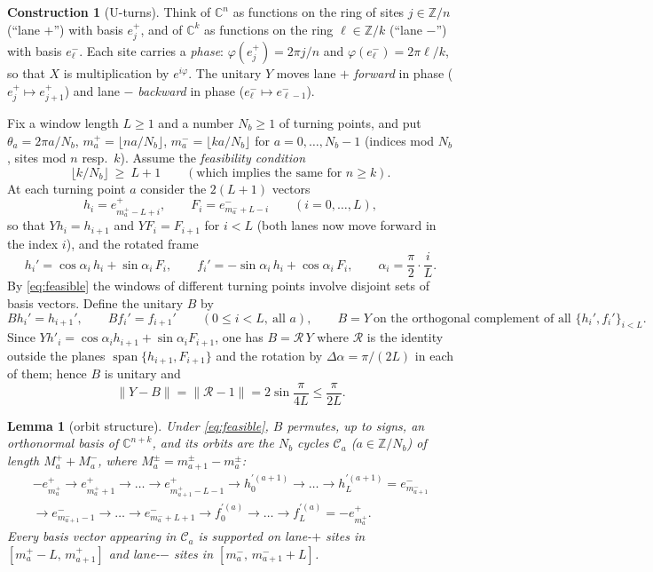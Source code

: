 \documentclass[11pt]{amsart}
\newtheorem{lemma}[theorem]{Lemma}
\theoremstyle{definition}
\newtheorem{construction}[theorem]{Construction}
\theoremstyle{remark}
\newcommand{\Z}{\mathbb Z}
\newcommand{\C}{\mathbb C}
\newcommand{\norm}[1]{\lVert #1\rVert}
\begin{document}
\begin{construction}[U-turns]\label{con:uturn}
Think of $\C^n$ as functions on the ring of sites $j\in\Z/n$ (``lane $+$'') with basis $e^+_j$, and of $\C^k$ as functions on the ring $\ell\in\Z/k$ (``lane $-$'') with basis $e^-_\ell$. Each site carries a \emph{phase}: $\varphi(e^+_j)=2\pi j/n$ and $\varphi(e^-_\ell)=2\pi\ell/k$, so that $X$ is multiplication by $e^{i\varphi}$. The unitary $Y$ moves lane $+$ \emph{forward} in phase ($e^+_j\mapsto e^+_{j+1}$) and lane $-$ \emph{backward} in phase ($e^-_\ell\mapsto e^-_{\ell-1}$).

Fix a window length $L\ge1$ and a number $N_b\ge1$ of turning points, and put $\theta_a=2\pi a/N_b$, $m^+_a=\lfloor na/N_b\rfloor$, $m^-_a=\lfloor ka/N_b\rfloor$ for $a=0,\dots,N_b-1$ (indices mod $N_b$, sites mod $n$ resp.\ $k$). Assume the \emph{feasibility condition}
\begin{equation}\label{eq:feasible}
\lfloor k/N_b\rfloor\ \ge\ L+1\qquad(\text{which implies the same for }n\ge k).
\end{equation}
At each turning point $a$ consider the $2(L+1)$ vectors
\[
h_i=e^+_{m^+_a-L+i},\qquad F_i=e^-_{m^-_a+L-i}\qquad(i=0,\dots,L),
\]
so that $Yh_i=h_{i+1}$ and $YF_i=F_{i+1}$ for $i<L$ (both lanes now move forward in the index $i$), and the rotated frame
\[
h_i'=\cos\alpha_i\,h_i+\sin\alpha_i\,F_i,\qquad f_i'=-\sin\alpha_i\,h_i+\cos\alpha_i\,F_i,\qquad \alpha_i=\frac{\pi}{2}\cdot\frac iL .
\]
By \eqref{eq:feasible} the windows of different turning points involve disjoint sets of basis vectors. Define the unitary $B$ by
\[
Bh_i'=h_{i+1}',\qquad Bf_i'=f_{i+1}'\qquad(0\le i<L,\ \text{all }a),\qquad B=Y\ \text{on the orthogonal complement of all }\{h_i',f_i'\}_{i<L}.
\]
Since $Yh'_i=\cos\alpha_i h_{i+1}+\sin\alpha_iF_{i+1}$, one has $B=\mathcal R\,Y$ where $\mathcal R$ is the identity outside the planes $\operatorname{span}\{h_{i+1},F_{i+1}\}$ and the rotation by $\Delta\alpha=\pi/(2L)$ in each of them; hence $B$ is unitary and
\begin{equation}\label{eq:YB}
\norm{Y-B}=\norm{\mathcal R-1}=2\sin\frac{\pi}{4L}\le\frac{\pi}{2L}.
\end{equation}
\end{construction}

\begin{lemma}[orbit structure]\label{lem:orbits}
Under \eqref{eq:feasible}, $B$ permutes, up to signs, an orthonormal basis of $\C^{n+k}$, and its orbits are the $N_b$ cycles $\mathcal C_a$ ($a\in\Z/N_b$) of length $M^+_a+M^-_a$, where $M^\pm_a=m^\pm_{a+1}-m^\pm_a$:
\begin{multline*}
-e^+_{m^+_a}\to e^+_{m^+_a+1}\to\dots\to e^+_{m^+_{a+1}-L-1}\to h^{\prime(a+1)}_0\to\dots\to h^{\prime(a+1)}_L=e^-_{m^-_{a+1}}\\
\to e^-_{m^-_{a+1}-1}\to\dots\to e^-_{m^-_a+L+1}\to f^{\prime(a)}_0\to\dots\to f^{\prime(a)}_L=-e^+_{m^+_a}.
\end{multline*}
Every basis vector appearing in $\mathcal C_a$ is supported on lane-$+$ sites in $[m^+_a-L,\,m^+_{a+1}]$ and lane-$-$ sites in $[m^-_a,\,m^-_{a+1}+L]$.
\end{lemma}
\end{document}
